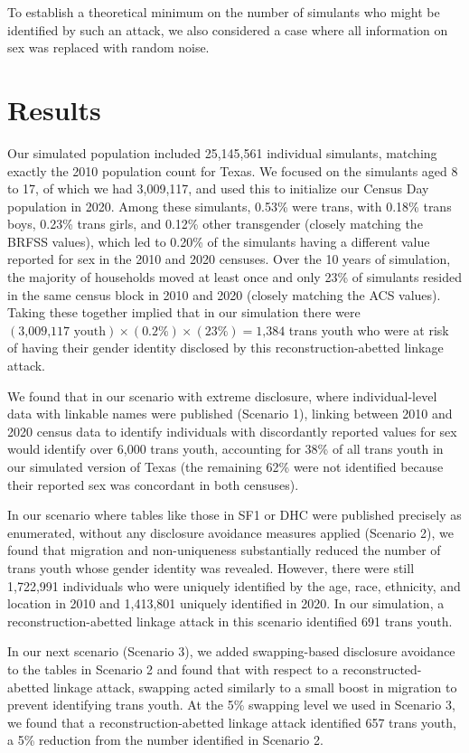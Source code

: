 \documentclass{jpc} %
\theoremstyle{plain}\newtheorem{satz}[thm]{Satz} %
\begin{document}
To establish a theoretical minimum on the number of simulants who might be identified by such an attack, we also considered a case where all information on sex was replaced with random noise.

\section*{Results}

Our simulated population included 25,145,561 individual simulants, matching exactly the 2010 population count for Texas.  We focused on the simulants aged 8 to 17, of which we had 3,009,117, and used this to initialize our Census Day population in 2020.
Among these simulants, 0.53\% were trans, with 0.18\% trans boys, 0.23\% trans girls, and 0.12\% other transgender (closely matching the BRFSS values), which led to 0.20\% of the simulants having a different value reported for sex in the 2010 and 2020 censuses.
Over the 10 years of simulation, the majority of households moved at least once and only 23\% of simulants resided in the same census block in 2010 and 2020 (closely matching the ACS values).
Taking these together implied that in our simulation there were $(\text{3,009,117} \text{ youth}) \times (0.2\%) \times (23\%) = \text{1,384}$ trans youth who were at risk of having their gender identity disclosed by this reconstruction-abetted linkage attack.

We found that in our scenario with extreme disclosure, where individual-level data with linkable names were published (Scenario 1), linking between 2010 and 2020 census data to identify individuals with discordantly reported values for sex would identify over 6,000 trans youth, accounting for 38\% of all trans youth in our simulated version of Texas (the remaining 62\% were not identified because their reported sex was concordant in both censuses).

In our scenario where tables like those in SF1 or DHC were published precisely as enumerated, without any disclosure avoidance measures applied (Scenario 2), we found that migration and non-uniqueness substantially reduced the number of trans youth whose gender identity was revealed.  However, there were still 1,722,991 individuals who were uniquely identified by the age, race, ethnicity, and location in 2010 and 1,413,801 uniquely identified in 2020.  In our simulation, a reconstruction-abetted linkage attack in this scenario identified 691 trans youth.

In our next scenario (Scenario 3), we added swapping-based disclosure avoidance to the tables in Scenario 2 and found that with respect to a reconstructed-abetted linkage attack, swapping acted similarly to a small boost in migration to prevent identifying trans youth.  At the 5\% swapping level we used in Scenario 3, we found that a reconstruction-abetted linkage attack identified 657 trans youth, a 5\% reduction from the number identified in Scenario 2.
\end{document}
